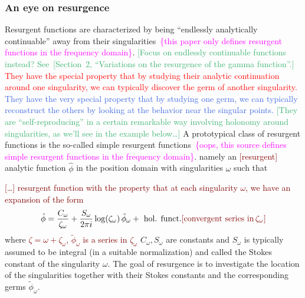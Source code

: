 \documentclass{article}
\theoremstyle{definition}
\newcommand{\series}[1]{\tilde{#1}}
\theoremstyle{plain}
\begin{document}
\subsubsection{An eye on resurgence}\label{apx:eye-res-airy}
Resurgent functions are characterized by being ``endlessly analytically continuable'' away from their singularities~\textcolor{magenta}{\cite[Section~1.2.2]{intro-to-ecalle}\{this paper only defines resurgent functions in the frequency domain\}}. \textcolor{MediumSeaGreen}{[Focus on endlessly continuable functions instead? See~[Section~2, ``Variations on the resurgence of the gamma function''.]} \textcolor{red}{They have the special property that by studying their analytic continuation around one singularity, we can typically discover the germ of another singularity.} \textcolor{RoyalBlue}{They have the very special property that by studying one germ, we can typically reconstruct the others by looking at the behavior near the singular points.} \textcolor{MediumSeaGreen}{[They are ``self-reproducing'' in a certain remarkable way involving holonomy around singularities, as we'll see in the example below\ldots]} A prototypical class of resurgent functions is the so-called simple resurgent functions~\textcolor{magenta}{\cite[Section~1.2.3]{intro-to-ecalle}\{oops, this source defines simple resurgent functions in the frequency domain\}}.  namely an \textcolor{Maroon}{[resurgent]} analytic function $\hat{\phi}$ in the position domain with singularities $\omega$ such that

\textcolor{Maroon}{[\ldots] resurgent function with the property that at each singularity $\omega$, we have an expansion of the form}
\begin{align*}
    \hat{\phi} = \frac{C_\omega}{\zeta_\omega}+\frac{S_\omega}{2\pi i} \log(\zeta_\omega)\,\series{\phi}_\omega + \text{ hol. funct.} \textcolor{Maroon}{[\text{convergent series in}\,\zeta_\omega]}
\end{align*}
where \textcolor{Maroon}{$\zeta = \omega + \zeta_\omega$, $\series{\phi}_\omega$ is a series in $\zeta_\omega$} $C_\omega, S_\omega$ are constants and $S_\omega$ is typically assumed to be integral (in a suitable normalization) and called the Stokes constant of the singularity $\omega$. The goal of resurgence is to investigate the location of the singularities together with their Stokes constants and the corresponding germs $\series{\phi}_\omega$.  
\end{document}
